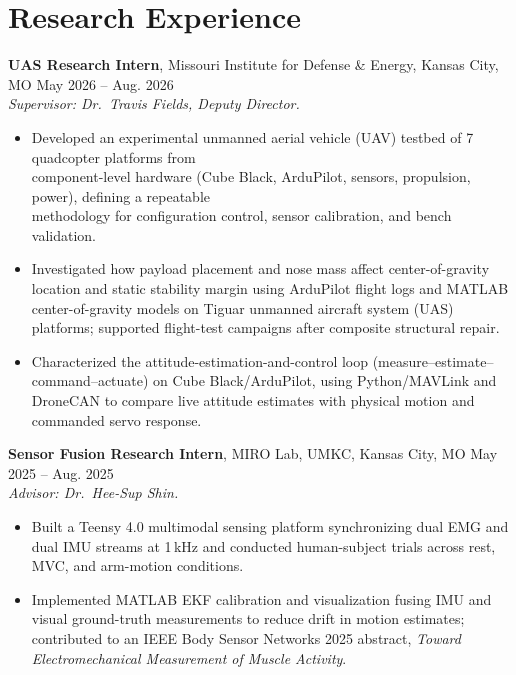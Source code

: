 \documentclass[11pt, letterpaper]{article}
\newcommand{\role}[5]{%
  \noindent\textbf{#1}, #2, #3, #4 \hfill #5%
}
\begin{document}
\section{Research Experience}
\role{UAS Research Intern}{Missouri Institute for Defense \& Energy}{Kansas City}{MO}{May 2026 -- Aug. 2026} \\[-2pt]
\textit{\small Supervisor: Dr.\ Travis Fields, Deputy Director.}
\begin{itemize}
\item Developed an experimental unmanned aerial vehicle (UAV) testbed of 7 quadcopter platforms from \\ component-level hardware (Cube Black, ArduPilot, sensors, propulsion, power), defining a repeatable \\ methodology for configuration control, sensor calibration, and bench validation.
\item Investigated how payload placement and nose mass affect center-of-gravity location and static stability margin using ArduPilot flight logs and MATLAB center-of-gravity models on Tiguar unmanned aircraft system (UAS) platforms; supported flight-test campaigns after composite structural repair.
\item Characterized the attitude-estimation-and-control loop (measure--estimate--command--actuate) on Cube Black/ArduPilot, using Python/MAVLink and DroneCAN to compare live attitude estimates with physical motion and commanded servo response.
\end{itemize}
\role{Sensor Fusion Research Intern}{MIRO Lab, UMKC}{Kansas City}{MO}{May 2025 -- Aug. 2025} \\[-2pt]
\textit{\small Advisor: Dr.\ Hee-Sup Shin.}
\begin{itemize}
\item Built a Teensy 4.0 multimodal sensing platform synchronizing dual EMG and dual IMU streams at 1\,kHz and conducted human-subject trials across rest, MVC, and arm-motion conditions.
\item Implemented MATLAB EKF calibration and visualization fusing IMU and visual ground-truth measurements to reduce drift in motion estimates; contributed to an IEEE Body Sensor Networks 2025 abstract, \textit{Toward Electromechanical Measurement of Muscle Activity}.
\end{itemize}
\end{document}

